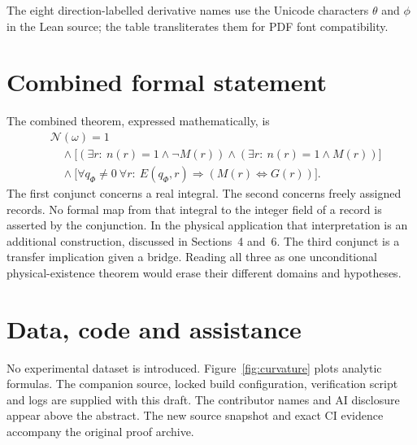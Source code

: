 \documentclass[11pt]{article}
\theoremstyle{definition}\newtheorem{definition}[theorem]{Definition}
\theoremstyle{remark}\newtheorem{remark}[theorem]{Remark}
\begin{document}
The eight direction-labelled derivative names use the Unicode characters $\theta$ and $\phi$ in the Lean source; the table transliterates them for PDF font compatibility.

\section{Combined formal statement}
The combined theorem, expressed mathematically, is
\begin{align*}
 &\mathcal N(\omega)=1\\[-0.3em]
 &\quad\land\bigl[(\exists r:\ n(r)=1\land\neg M(r))
       \land(\exists r:\ n(r)=1\land M(r))\bigr]\\[-0.3em]
 &\quad\land\bigl[\forall q_\Phi\neq0\ \forall r:\
 E(q_\Phi,r)\Rightarrow(M(r)\Longleftrightarrow G(r))\bigr].
\end{align*}
The first conjunct concerns a real integral. The second concerns freely assigned records. No formal map from that integral to the integer field of a record is asserted by the conjunction. In the physical application that interpretation is an additional construction, discussed in Sections~4 and~6. The third conjunct is a transfer implication given a bridge. Reading all three as one unconditional physical-existence theorem would erase their different domains and hypotheses.

\section*{Data, code and assistance}
No experimental dataset is introduced. Figure~\ref{fig:curvature} plots analytic formulas. The companion source, locked build configuration, verification script and logs are supplied with this draft. The contributor names and AI disclosure appear above the abstract. The new source snapshot and exact CI evidence accompany the original proof archive.
\end{document}
